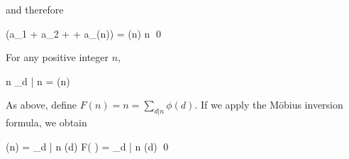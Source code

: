 and therefore

(a_1 + a_2 + \cdots + a_{\phi(n)}) = \phi(n) n \qed
\eee

\begin{theorem}
  For any positive integer $n$,

  \bee
    n \sum_{d | n}  = \phi(n)
  \eee

\end{theorem}

As above, define $F(n) = n = \sum_{d | n} \phi(d)$. If we apply the Möbius inversion formula, we obtain

\bee
\phi(n) = \sum_{d | n} \mu(d) F\left(  \right) = \sum_{d | n} \mu(d)  \qed
\eee



